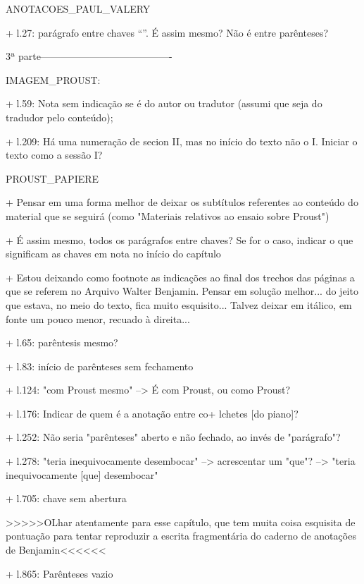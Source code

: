ANOTACOES_PAUL_VALERY

+ l.27: parágrafo entre chaves ``{}''. É assim mesmo? Não é entre parênteses?

3ª parte----------------------------------------

IMAGEM_PROUST:

+ l.59: Nota sem indicação se é do autor ou tradutor (assumi que seja do tradudor pelo conteúdo);

+ l.209: Há uma numeração de secion II, mas no início do texto não o I. Iniciar o texto como a sessão I?

PROUST_PAPIERE

+ Pensar em uma forma melhor de deixar os subtítulos referentes ao conteúdo do material que se seguirá (como "Materiais relativos ao ensaio sobre Proust")

+ É assim mesmo, todos os parágrafos entre chaves? Se for o caso, indicar o que significam as chaves em nota no início do capítulo

+ Estou deixando como footnote as indicações ao final dos trechos das páginas a que se referem no Arquivo Walter Benjamin. Pensar em solução melhor... do jeito que estava, no meio do texto, fica muito esquisito... Talvez deixar em itálico, em fonte um pouco menor, recuado à direita...

+ l.65: parêntesis mesmo?

+ l.83: início de parênteses sem fechamento

+ l.124: "com Proust mesmo" --> É com Proust, ou como Proust?

+ l.176: Indicar de quem é a anotação entre co+ lchetes [do piano]?

+ l.252: Não seria "parênteses" aberto e não fechado, ao invés de "parágrafo"?

+ l.278: "teria inequivocamente desembocar" --> acrescentar um "que"? --> "teria inequivocamente [que] desembocar"

+ l.705: chave sem abertura

>>>>>OLhar atentamente para esse capítulo, que tem muita coisa esquisita de pontuação para tentar reproduzir a escrita fragmentária do caderno de anotações de Benjamin<<<<<<

+ l.865: Parênteses vazio